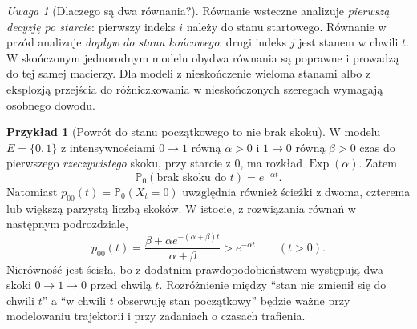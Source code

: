 \documentclass[11pt,a4paper,oneside]{report}
\numberwithin{equation}{chapter}
\theoremstyle{plain}
\theoremstyle{definition}
\newtheorem{przyklad}{Przykład}[chapter]
\theoremstyle{remark}
\newtheorem{uwaga}{Uwaga}[chapter]
\newcommand{\Prob}{\mathbb{P}}
\begin{document}
\begin{uwaga}[Dlaczego są dwa równania?]
Równanie wsteczne analizuje \emph{pierwszą decyzję po starcie}:
pierwszy indeks $i$ należy do stanu startowego.
Równanie w przód analizuje \emph{dopływ do stanu końcowego}:
drugi indeks $j$ jest stanem w chwili $t$.
W skończonym jednorodnym modelu obydwa równania są poprawne
i prowadzą do tej samej macierzy. Dla modeli z nieskończenie
wieloma stanami albo z eksplozją przejścia do różniczkowania
w nieskończonych szeregach wymagają osobnego dowodu.
\end{uwaga}


\begin{przyklad}[Powrót do stanu początkowego to nie brak skoku]
W modelu $E=\{0,1\}$ z intensywnościami
$0\to1$ równą $\alpha>0$ i $1\to0$ równą $\beta>0$
czas do pierwszego \emph{rzeczywistego} skoku, przy starcie
z $0$, ma rozkład $\operatorname{Exp}(\alpha)$. Zatem
\[
\Prob_0(\text{brak skoku do }t)=e^{-\alpha t}.
\]
Natomiast $p_{00}(t)=\Prob_0(X_t=0)$ uwzględnia również
ścieżki z dwoma, czterema lub większą parzystą liczbą skoków.
W istocie, z rozwiązania równań w następnym podrozdziale,
\[
 p_{00}(t)=\frac{\beta+\alpha e^{-(\alpha+\beta)t}}
 {\alpha+\beta}>e^{-\alpha t}\qquad(t>0).
\]
Nierówność jest ścisła, bo z dodatnim prawdopodobieństwem
występują dwa skoki $0\to1\to0$ przed chwilą $t$.
Rozróżnienie między ``stan nie zmienił się do chwili $t$''
a ``w chwili $t$ obserwuję stan początkowy'' będzie ważne
przy modelowaniu trajektorii i przy zadaniach o czasach trafienia.
\end{przyklad}
\end{document}
